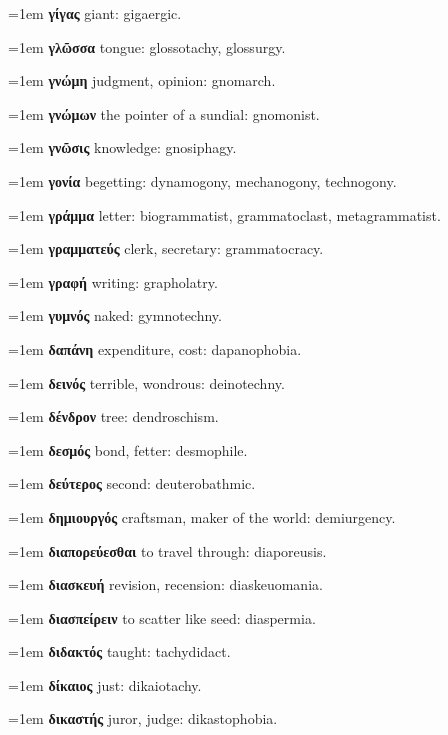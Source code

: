 \hangindent=1em \textbf{γίγας} giant: gigaergic.\par
\hangindent=1em \textbf{γλῶσσα} tongue: glossotachy, glossurgy.\par
\hangindent=1em \textbf{γνώμη} judgment, opinion: gnomarch.\par
\hangindent=1em \textbf{γνώμων} the pointer of a sundial: gnomonist.\par
\hangindent=1em \textbf{γνῶσις} knowledge: gnosiphagy.\par
\hangindent=1em \textbf{γονία} begetting: dynamogony, mechanogony, technogony.\par
\hangindent=1em \textbf{γράμμα} letter: biogrammatist, grammatoclast, metagrammatist.\par
\hangindent=1em \textbf{γραμματεύς} clerk, secretary: grammatocracy.\par
\hangindent=1em \textbf{γραφή} writing: grapholatry.\par
\hangindent=1em \textbf{γυμνός} naked: gymnotechny.\par
\hangindent=1em \textbf{δαπάνη} expenditure, cost: dapanophobia.\par
\hangindent=1em \textbf{δεινός} terrible, wondrous: deinotechny.\par
\hangindent=1em \textbf{δένδρον} tree: dendroschism.\par
\hangindent=1em \textbf{δεσμός} bond, fetter: desmophile.\par
\hangindent=1em \textbf{δεύτερος} second: deuterobathmic.\par
\hangindent=1em \textbf{δημιουργός} craftsman, maker of the world: demiurgency.\par
\hangindent=1em \textbf{διαπορεύεσθαι} to travel through: diaporeusis.\par
\hangindent=1em \textbf{διασκευή} revision, recension: diaskeuomania.\par
\hangindent=1em \textbf{διασπείρειν} to scatter like seed: diaspermia.\par
\hangindent=1em \textbf{διδακτός} taught: tachydidact.\par
\hangindent=1em \textbf{δίκαιος} just: dikaiotachy.\par
\hangindent=1em \textbf{δικαστής} juror, judge: dikastophobia.\par
